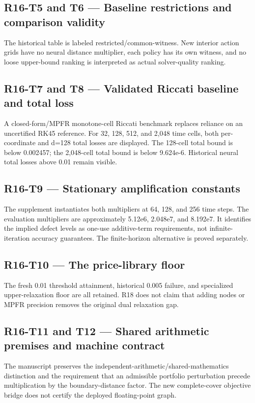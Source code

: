 \documentclass[ecta]{econsocart}
\theoremstyle{remark}
\begin{document}
\subsection{R16-T5 and T6 --- Baseline restrictions and comparison validity}
The historical table is labeled restricted/common-witness. New interior action grids have no neural distance multiplier, each policy has its own witness, and no loose upper-bound ranking is interpreted as actual solver-quality ranking.

\subsection{R16-T7 and T8 --- Validated Riccati baseline and total loss}
A closed-form/MPFR monotone-cell Riccati benchmark replaces reliance on an uncertified RK45 reference. For 32, 128, 512, and 2,048 time cells, both per-coordinate and d=128 total losses are displayed. The 128-cell total bound is below 0.002457; the 2,048-cell total bound is below 9.624e-6. Historical neural total losses above 0.01 remain visible.

\subsection{R16-T9 --- Stationary amplification constants}
The supplement instantiates both multipliers at 64, 128, and 256 time steps. The evaluation multipliers are approximately 5.12e6, 2.048e7, and 8.192e7. It identifies the implied defect levels as one-use additive-term requirements, not infinite-iteration accuracy guarantees. The finite-horizon alternative is proved separately.

\subsection{R16-T10 --- The price-library floor}
The fresh 0.01 threshold attainment, historical 0.005 failure, and specialized upper-relaxation floor are all retained. R18 does not claim that adding nodes or MPFR precision removes the original dual relaxation gap.

\subsection{R16-T11 and T12 --- Shared arithmetic premises and machine contract}
The manuscript preserves the independent-arithmetic/shared-mathematics distinction and the requirement that an admissible portfolio perturbation precede multiplication by the boundary-distance factor. The new complete-cover objective bridge does not certify the deployed floating-point graph.
\end{document}
